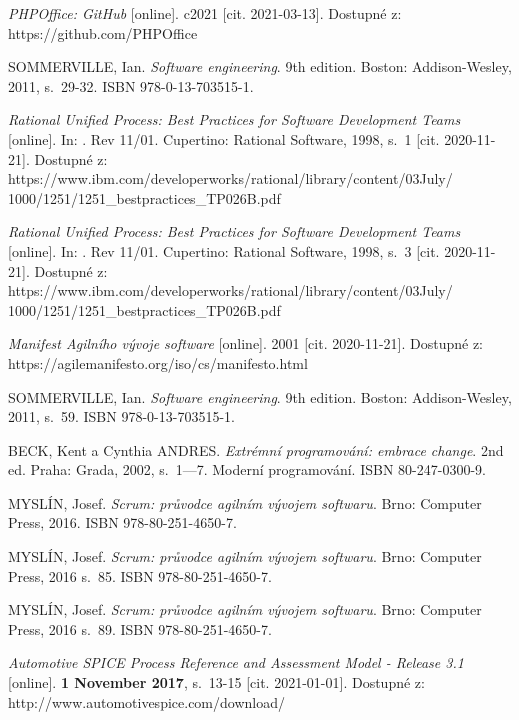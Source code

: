 \documentclass[czech,master]{diploma}
\begin{document}
\begin{thebibliography}{43}
\textit{PHPOffice: GitHub} [online]. c2021 [cit. 2021-03-13]. Dostupné z: https://github.com/PHPOffice



SOMMERVILLE, Ian. \textit{Software engineering}. 9th edition. Boston: Addison-Wesley, 2011, s.~29-32. ISBN 978-0-13-703515-1.

\textit{Rational Unified Process: Best Practices for Software Development Teams} [online]. In: . Rev 11/01. Cupertino: Rational Software, 1998, s.~1 [cit. 2020-11-21]. Dostupné z: https://www.ibm.com/developerworks/rational/library/content/03July/
1000/1251/1251\_bestpractices\_TP026B.pdf

\textit{Rational Unified Process: Best Practices for Software Development Teams} [online]. In: . Rev 11/01. Cupertino: Rational Software, 1998, s.~3 [cit. 2020-11-21]. Dostupné z: https://www.ibm.com/developerworks/rational/library/content/03July/
1000/1251/1251\_bestpractices\_TP026B.pdf

\textit{Manifest Agilního vývoje software} [online]. 2001 [cit. 2020-11-21]. Dostupné z: https://agilemanifesto.org/iso/cs/manifesto.html

SOMMERVILLE, Ian. \textit{Software engineering}. 9th edition. Boston: Addison-Wesley, 2011, s.~59. ISBN 978-0-13-703515-1.

BECK, Kent a Cynthia ANDRES. \textit{Extrémní programování: embrace change}. 2nd ed. Praha: Grada, 2002, s.~1---7. Moderní programování. ISBN 80-247-0300-9.

MYSLÍN, Josef. \textit{Scrum: průvodce agilním vývojem softwaru}. Brno: Computer Press, 2016. ISBN 978-80-251-4650-7.

MYSLÍN, Josef. \textit{Scrum: průvodce agilním vývojem softwaru}. Brno: Computer Press, 2016 s.~85. ISBN 978-80-251-4650-7.

MYSLÍN, Josef. \textit{Scrum: průvodce agilním vývojem softwaru}. Brno: Computer Press, 2016 s.~89. ISBN 978-80-251-4650-7.



\textit{Automotive SPICE Process Reference and Assessment Model - Release 3.1} [online]. \textbf{1 November 2017}, s.~13-15 [cit. 2021-01-01]. Dostupné z: http://www.automotivespice.com/download/




\end{thebibliography}
\end{document}
